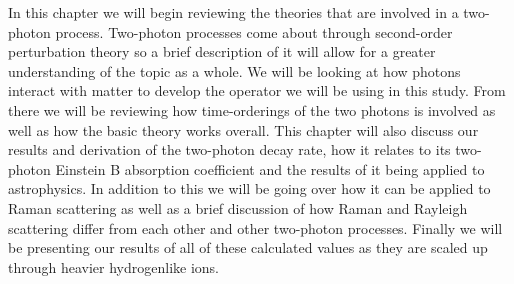 In this chapter we will begin reviewing the theories that are involved in a two-photon process. Two-photon processes come about through second-order perturbation theory so a brief description of it will allow for a greater understanding of the topic as a whole. We will be looking at how photons interact with matter to develop the operator we will be using in this study. From there we will be reviewing how time-orderings of the two photons is involved as well as how the basic theory works overall. This chapter will also discuss our results and derivation of the two-photon decay rate, how it relates to its two-photon Einstein B absorption coefficient and the results of it being applied to astrophysics. In addition to this we will be going over how it can be applied to Raman scattering as well as a brief discussion of how Raman and Rayleigh scattering differ from each other and other two-photon processes. Finally we will be presenting our results of all of these calculated values as they are scaled up through heavier hydrogenlike ions. 
